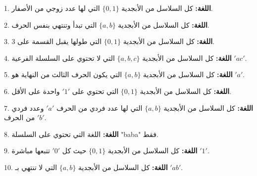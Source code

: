 \documentclass[12pt]{article}
\begin{document}
1.  \textbf{اللغة:} كل السلاسل من الأبجدية $\{0, 1\}$ التي لها عدد زوجي من الأصفار.

2.  \textbf{اللغة:} كل السلاسل من الأبجدية $\{a, b\}$ التي تبدأ وتنتهي بنفس الحرف.

3.  \textbf{اللغة:} كل السلاسل من الأبجدية $\{0, 1\}$ التي طولها يقبل القسمة على 3.

4.  \textbf{اللغة:} كل السلاسل من الأبجدية $\{a, b, c\}$ التي لا تحتوي على السلسلة الفرعية $'ac'$.

5.  \textbf{اللغة:} كل السلاسل من الأبجدية $\{a, b\}$ التي يكون الحرف الثالث من النهاية هو $'a'$.

6.  \textbf{اللغة:} كل السلاسل من الأبجدية $\{0, 1\}$ التي تحتوي على $'1'$ واحدة على الأقل.

7.  \textbf{اللغة:} كل السلاسل من الأبجدية $\{a, b\}$ التي لها عدد فردي من الحرف $'a'$ وعدد فردي من الحرف $'b'$.

8.  \textbf{اللغة:} اللغة التي تحتوي على السلسلة "baba" فقط.

9.  \textbf{اللغة:} كل السلاسل من الأبجدية $\{0, 1\}$ حيث كل $'0'$ تتبعها مباشرة $'1'$.

10. \textbf{اللغة:} كل السلاسل من الأبجدية $\{a, b\}$ التي لا تنتهي بـ $'ab'$.
\end{document}
